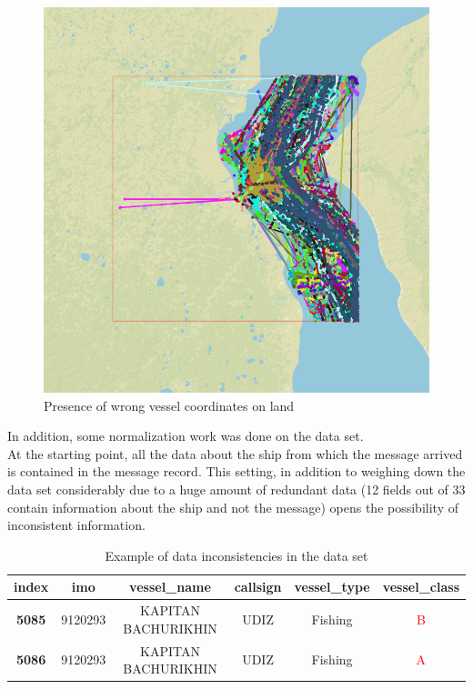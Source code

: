 \begin{itemize}
        
        \begin{figure}[H]
            \centering
            \includegraphics[width=12cm]{Images/2/land-points.png}
            \caption{Presence of wrong vessel coordinates on land}
        \end{figure}
        

        
    \end{itemize}

        
    In addition, some normalization work was done on the data set.
    \\
    At the starting point, all the data about the ship from which the message arrived is contained in the message record. This setting, in addition to weighing down the data set considerably due to a huge amount of redundant data (12 fields out of 33 contain information about the ship and not the message) opens the possibility of inconsistent information.
    \\
    
    \begin{table}[H]
    \begin{tabular}{|c|c|c|c|c|c|}
        \hline
            \textbf{index} & \textbf{imo} & \textbf{vessel\_name} & \textbf{callsign} & \textbf{vessel\_type} & \textbf{vessel\_class} \\
        \hline
            \textbf{5085} & 9120293      & KAPITAN BACHURIKHIN   & UDIZ              & Fishing               & \textcolor{red}{B}      \\
            \textbf{5086} & 9120293      & KAPITAN BACHURIKHIN   & UDIZ              & Fishing               & \textcolor{red}{A}      \\
        \hline
    \end{tabular}
    \caption{Example of data inconsistencies in the data set}
    \end{table}
    \\
    
